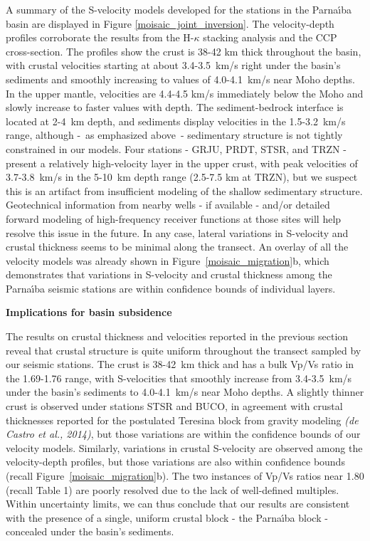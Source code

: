 \documentclass[manuscript,11pt]{geophysics}
\begin{document}
A summary of the S-velocity models developed for the stations in the Parna\'{\i}ba basin are displayed in Figure \ref{moisaic_joint_inversion}. The velocity-depth profiles corroborate the results from the H-$\kappa$ stacking analysis and the CCP cross-section. The profiles show the crust is 38-42 km thick throughout the basin, with crustal velocities starting at about 3.4-3.5~km/s right under the basin's sediments and smoothly increasing to values of 4.0-4.1~km/s near Moho depths. In the upper mantle, velocities are 4.4-4.5 km/s immediately below the Moho and slowly increase to faster values with depth. The sediment-bedrock interface is located at 2-4~km depth, and sediments display velocities in the 1.5-3.2~km/s range, although -~as emphasized above~- sedimentary structure is not tightly constrained in our models. Four stations - GRJU, PRDT, STSR, and TRZN - present a relatively high-velocity layer in the upper crust, with peak velocities of 3.7-3.8~km/s in the 5-10~km depth range (2.5-7.5 km at TRZN), but we suspect this is an artifact from insufficient modeling of the shallow sedimentary structure. Geotechnical information from nearby wells - if available - and/or detailed forward modeling of high-frequency receiver functions at those sites will help resolve this issue in the future. In any case, lateral variations in S-velocity and crustal thickness seems to be minimal along the transect. An overlay of all the velocity models was already shown in Figure~\ref{moisaic_migration}b, which demonstrates that variations in S-velocity and crustal thickness among the Parna\'{\i}ba seismic stations are within confidence bounds of individual layers.

\begin{flushleft}
\textbf{\LARGE Implications for basin subsidence}
\end{flushleft}

The results on crustal thickness and velocities reported in the previous section reveal that crustal structure is quite uniform throughout the transect sampled by our seismic stations. The crust is 38-42~km thick and has a bulk Vp/Vs ratio in the 1.69-1.76 range, with S-velocities that smoothly increase from 3.4-3.5~km/s under the basin's sediments to 4.0-4.1~km/s near Moho depths. A slightly thinner crust is observed under stations STSR and BUCO, in agreement with crustal thicknesses reported for the postulated Teresina block from gravity modeling \textit{(de Castro et al., 2014)}, but those variations are within the confidence bounds of our velocity models. Similarly, variations in crustal S-velocity are observed among the velocity-depth profiles, but those variations are also within confidence bounds (recall Figure~\ref{moisaic_migration}b). The two instances of Vp/Vs ratios near 1.80 (recall Table 1) are poorly resolved due to the lack of well-defined multiples. Within uncertainty limits, we can thus conclude that our results are consistent with the presence of a single, uniform crustal block - the Parna\'{\i}ba block - concealed under the basin's sediments. 
\end{document}
